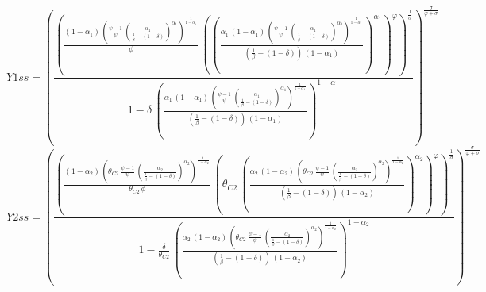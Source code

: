 \begin{dmath*}
Y1ss = \left(\frac{\left(\frac{\left(1-{{\alpha_{1}}}\right)\, \left(\frac{{{\psi}}-1}{{{\psi}}}\, \left(\frac{{{\alpha_{1}}}}{\frac{1}{{{\beta}}}-\left(1-{{\delta}}\right)}\right)^{{{\alpha_{1}}}}\right)^{\frac{1}{1-{{\alpha_{1}}}}}}{{{\phi}}}\, \left(\left(\frac{{{\alpha_{1}}}\, \left(1-{{\alpha_{1}}}\right)\, \left(\frac{{{\psi}}-1}{{{\psi}}}\, \left(\frac{{{\alpha_{1}}}}{\frac{1}{{{\beta}}}-\left(1-{{\delta}}\right)}\right)^{{{\alpha_{1}}}}\right)^{\frac{1}{1-{{\alpha_{1}}}}}}{\left(\frac{1}{{{\beta}}}-\left(1-{{\delta}}\right)\right)\, \left(1-{{\alpha_{1}}}\right)}\right)^{{{\alpha_{1}}}}\right)^{{{\varphi}}}\right)^{\frac{1}{{{\sigma}}}}}{1-{{\delta}}\, \left(\frac{{{\alpha_{1}}}\, \left(1-{{\alpha_{1}}}\right)\, \left(\frac{{{\psi}}-1}{{{\psi}}}\, \left(\frac{{{\alpha_{1}}}}{\frac{1}{{{\beta}}}-\left(1-{{\delta}}\right)}\right)^{{{\alpha_{1}}}}\right)^{\frac{1}{1-{{\alpha_{1}}}}}}{\left(\frac{1}{{{\beta}}}-\left(1-{{\delta}}\right)\right)\, \left(1-{{\alpha_{1}}}\right)}\right)^{1-{{\alpha_{1}}}}}\right)^{\frac{{{\sigma}}}{{{\varphi}}+{{\sigma}}}}
\end{dmath*}
\begin{dmath*}
Y2ss = \left(\frac{\left(\frac{\left(1-{{\alpha_{2}}}\right)\, \left({{\theta_{C2}}}\, \frac{{{\psi}}-1}{{{\psi}}}\, \left(\frac{{{\alpha_{2}}}}{\frac{1}{{{\beta}}}-\left(1-{{\delta}}\right)}\right)^{{{\alpha_{2}}}}\right)^{\frac{1}{1-{{\alpha_{2}}}}}}{{{\theta_{C2}}}\, {{\phi}}}\, \left({{\theta_{C2}}}\, \left(\frac{{{\alpha_{2}}}\, \left(1-{{\alpha_{2}}}\right)\, \left({{\theta_{C2}}}\, \frac{{{\psi}}-1}{{{\psi}}}\, \left(\frac{{{\alpha_{2}}}}{\frac{1}{{{\beta}}}-\left(1-{{\delta}}\right)}\right)^{{{\alpha_{2}}}}\right)^{\frac{1}{1-{{\alpha_{2}}}}}}{\left(\frac{1}{{{\beta}}}-\left(1-{{\delta}}\right)\right)\, \left(1-{{\alpha_{2}}}\right)}\right)^{{{\alpha_{2}}}}\right)^{{{\varphi}}}\right)^{\frac{1}{{{\sigma}}}}}{1-\frac{{{\delta}}}{{{\theta_{C2}}}}\, \left(\frac{{{\alpha_{2}}}\, \left(1-{{\alpha_{2}}}\right)\, \left({{\theta_{C2}}}\, \frac{{{\psi}}-1}{{{\psi}}}\, \left(\frac{{{\alpha_{2}}}}{\frac{1}{{{\beta}}}-\left(1-{{\delta}}\right)}\right)^{{{\alpha_{2}}}}\right)^{\frac{1}{1-{{\alpha_{2}}}}}}{\left(\frac{1}{{{\beta}}}-\left(1-{{\delta}}\right)\right)\, \left(1-{{\alpha_{2}}}\right)}\right)^{1-{{\alpha_{2}}}}}\right)^{\frac{{{\sigma}}}{{{\varphi}}+{{\sigma}}}}
\end{dmath*}

